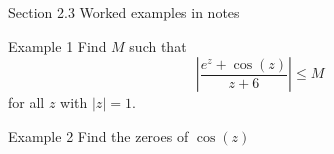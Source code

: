 \documentclass{beamer}
\begin{document}
    \begin{frame}[plain]
     \end{frame}

\begin{frame}{Section 2.3 Worked examples in notes}
\begin{block}{Example 1}
Find $M$ such that 
$$\left| \frac{e^z+\cos(z)}{z+6}\right| \leq M$$
for all $z$ with $|z|=1$.
\end{block}
\begin{block}{Example 2}
Find the zeroes of $\cos(z)$
\end{block}
\end{frame}
\end{document}

